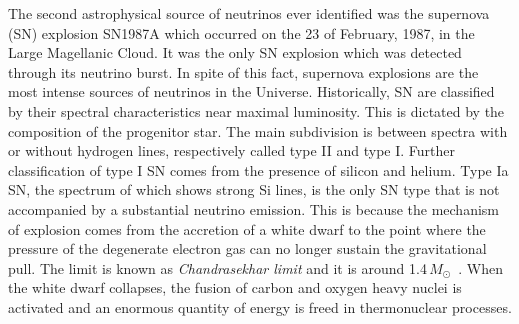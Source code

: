 The second astrophysical source of neutrinos ever identified was the supernova (SN) explosion SN1987A %
which occurred on the 23 of February, 1987, in the Large Magellanic Cloud.
It was the only SN explosion which was detected through its neutrino burst. %
In spite of this fact, supernova explosions are the most intense sources of neutrinos in the Universe.
Historically, SN are classified by their spectral characteristics near maximal luminosity.
This is dictated by the composition of the progenitor star.
The main subdivision is between spectra with or without hydrogen lines, respectively called %
type II and type I.
Further classification of type I SN comes from the presence of silicon and helium.
Type Ia SN, the spectrum of which shows strong Si lines, is the only SN type that is not accompanied %
by a substantial neutrino emission.
This is because the mechanism of explosion comes from the accretion of a white dwarf to the point where %
the pressure of the degenerate electron gas can no longer sustain the gravitational pull.
The limit is known as \emph{Chandrasekhar limit} and it is around 1.4\,$M_\odot$~\cite{Chandrasekhar:1931ih}.
When the white dwarf collapses, the fusion of carbon and oxygen heavy nuclei is activated %
and an enormous quantity of energy is freed in thermonuclear processes.

